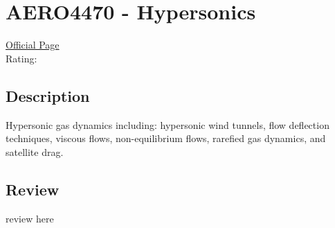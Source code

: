 \hypertarget{AERO4470}{\section{AERO4470 - Hypersonics}}

\large
\textcolor{turbo_purple}{\href{https://my.uq.edu.au/programs-courses/course.html?course_code=AERO4470}{Official Page}} \\
Rating: \cstar\cstar\cstar\cstar\ostar

\normalsize
\subsection*{Description}
Hypersonic gas dynamics including: hypersonic wind tunnels, flow deflection techniques, viscous flows, non-equilibrium flows, rarefied gas dynamics, and satellite drag.

\subsection*{Review}
review here
